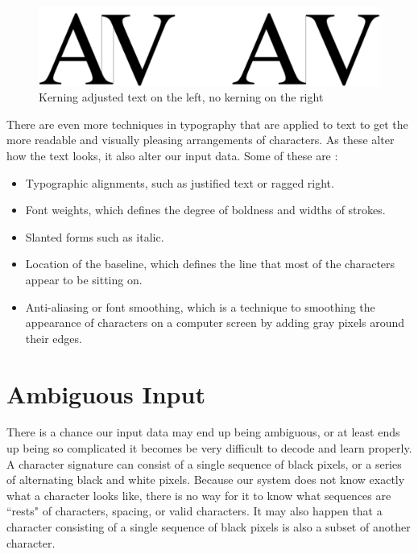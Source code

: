 \begin{figure}[ht]
    \centering
    \includegraphics[width=1.0\textwidth]{fig/chapter2/kerning.png}
    \caption{Kerning adjusted text on the left, no kerning on the right}
    \label{fig:kerning-comparison}
\end{figure}

\newpage
There are even more techniques in typography that are applied to text to get the more readable and visually pleasing arrangements of characters. As these alter how the text looks, it also alter our input data. Some of these are \citep{felici2011complete}:

\begin{itemize}
    \item Typographic alignments, such as justified text or ragged right.
    \item Font weights, which defines the degree of boldness and widths of strokes.
    \item Slanted forms such as italic.
    \item Location of the baseline, which defines the line that most of the characters appear to be sitting on.
    \item Anti-aliasing or font smoothing, which is a technique to smoothing the appearance of characters on a computer screen by adding gray pixels around their edges.
\end{itemize}


\section{Ambiguous Input}
\label{sec:ambiguous_input}
There is a chance our input data may end up being ambiguous, or at least ends up being so complicated it becomes be very difficult to decode and learn properly. A character signature can consist of a single sequence of black pixels, or a series of alternating black and white pixels. Because our system does not know exactly what a character looks like, there is no way for it to know what sequences are ``rests" of characters, spacing, or valid characters. It may also happen that a character consisting of a single sequence of black pixels is also a subset of another character. 

